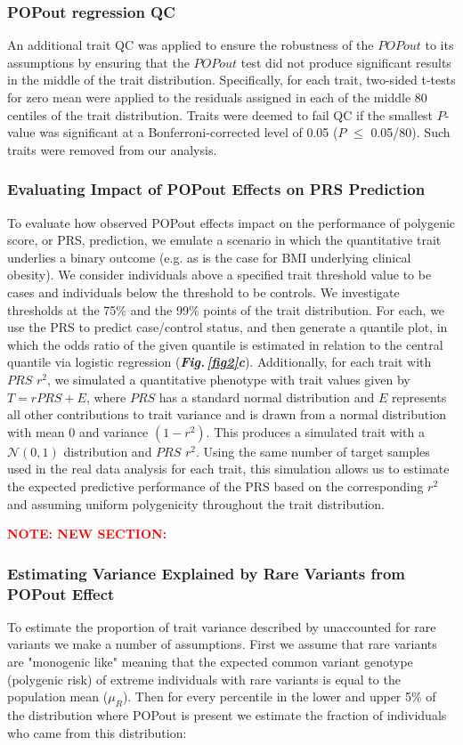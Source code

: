 \documentclass[12pt]{zHenriquesLab-StyleBioRxiv}
\newcommand\dref[2]{\normalsize{\textbf{\textit{Fig.\,\ref{#1}#2}}}\normalsize{}}
\newcommand\note[1]{\textbf{\textcolor{red}{\scriptsize{NOTE: #1}}}}
\begin{document}
\subsubsection*{POPout regression QC}
An additional trait QC was applied to ensure the robustness of the
$POPout$ to its assumptions by ensuring that the $POPout$ test 
did not produce significant results in the middle of the trait distribution. 
Specifically, for each trait, two-sided t-tests for zero mean were
applied to the residuals assigned in each of the middle 80 centiles of
the trait distribution. Traits were deemed to fail QC if the smallest
$P$-value was significant at a Bonferroni-corrected level of 0.05 ($P$
$\le$ 0.05/80). Such traits were removed from our analysis.

\subsubsection*{Evaluating Impact of POPout Effects on PRS Prediction} 
To evaluate how observed POPout effects impact on the performance of 
polygenic score, or PRS, prediction, we emulate a scenario in which the 
quantitative trait underlies a binary outcome (e.g. as is the case for BMI 
underlying clinical obesity). We consider individuals above a specified 
trait threshold value to be cases and individuals below the threshold to 
be controls. We investigate thresholds at the 75\% and the 99\% points of 
the trait distribution. For each, we use the PRS to predict case/control 
status, and then generate a quantile plot, in which the odds ratio of the 
given quantile is estimated in relation to the central quantile via logistic 
regression (\dref{fig2}{c}). Additionally, for each trait with $PRS$ $r^2$, we simulated 
a quantitative phenotype with trait values given by $T=r{PRS}+E$, where 
$PRS$ has a standard normal distribution and $E$ represents all other contributions 
to trait variance and is drawn from a normal distribution with mean 0 and 
variance $(1-r^2)$. This produces a simulated trait with a $\mathcal{N}(0,1)$ 
distribution and $PRS$ $r^2$. Using the same number of target samples 
used in the real data analysis for each trait, this simulation allows us to 
estimate the expected predictive performance of the PRS based on the 
corresponding $r^2$ and assuming uniform polygenicity throughout the 
trait distribution. 

\clearpage \newpage
\note{NEW SECTION:} 
\subsubsection*{Estimating Variance Explained by Rare Variants from POPout Effect} 
To estimate the proportion of trait variance described by unaccounted for 
rare variants we make a number of assumptions.  First we assume that rare 
variants are "monogenic like" meaning that the expected common variant 
genotype (polygenic risk) of extreme individuals with rare variants is equal 
to the population mean ($\mu_R$).  Then for every percentile in the lower and upper 5\% of 
the distribution where POPout is present we estimate the fraction of individuals 
who came from this distribution: 
\end{document}
